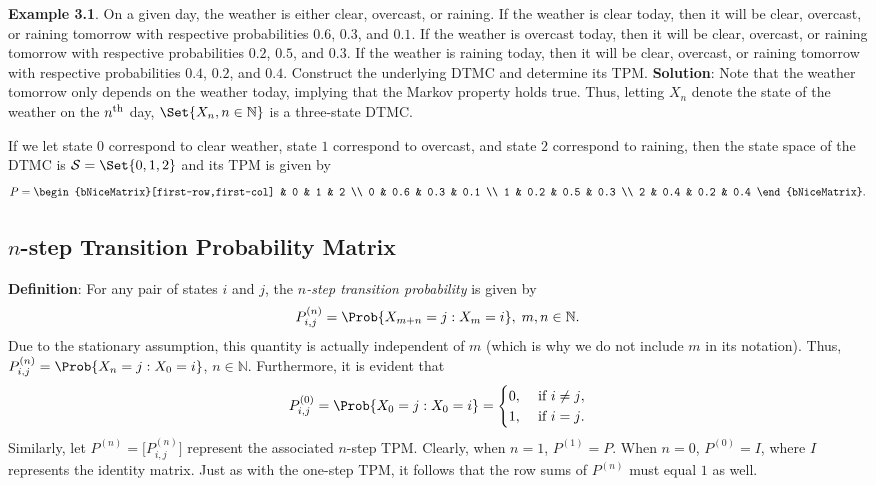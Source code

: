 \begin{Example}
    \textbf{Example 3.1}. On a given day, the weather is either clear, overcast, or raining. If the weather
    is clear today, then it will be clear, overcast, or raining tomorrow with respective probabilities
    $0.6$, $0.3$, and $0.1$. If the weather is overcast today, then it will be clear, overcast, or raining
    tomorrow with respective probabilities $0.2$, $0.5$, and $0.3$. If the weather is raining today, then it
    will be clear, overcast, or raining tomorrow with respective probabilities $0.4$, $0.2$, and $0.4$.
    Construct the underlying DTMC and determine its TPM\@.
    \tcblower{}
    \textbf{Solution}: Note that the weather tomorrow only depends on the weather
    today, implying that the Markov property holds true. Thus,
    letting $ X_n $ denote the state of the weather on the $ n\textsuperscript{th} $
    day, $ \Set{X_n,n\in\mathbb{N}} $ is a three-state DTMC\@.

    If we let state $ 0 $ correspond to clear weather, state $ 1 $
    correspond to overcast, and state $ 2 $ correspond to raining,
    then the state space of the DTMC is $ \mathcal{S}=\Set{0,1,2} $
    and its TPM is given by
    \[ P=\begin{bNiceMatrix}[first-row,first-col]
              & 0   & 1   & 2   \\
            0 & 0.6 & 0.3 & 0.1 \\
            1 & 0.2 & 0.5 & 0.3 \\
            2 & 0.4 & 0.2 & 0.4
        \end{bNiceMatrix}. \]
\end{Example}
\subsection*{$ n $-step Transition Probability Matrix}
\begin{Regular}
    \textbf{Definition}: For any pair of states $ i $ and $ j $, the \emph{$ n $-step transition probability} is given by
    \[ P_{i,j}^{(n)}=\Prob{X_{m+n}=j\given X_m=i},\; m,n\in\mathbb{N}. \]
    Due to the stationary assumption, this quantity is actually independent of $m$ (which is why we
    do not include $m$ in its notation). Thus, $ P_{i,j}^{(n)}=\Prob{X_n=j\given X_0=i} $, $ n\in\mathbb{N} $.
    Furthermore, it is evident that
    \[ P_{i,j}^{(0)}=\Prob{X_0=j\given X_0=i}=
        \begin{cases}
            0, & \text{ if $ i\ne j $}, \\
            1, & \text{ if $ i=j $.}
        \end{cases} \]
    Similarly, let $ P^{(n)}=\bigl[P_{i,j}^{(n)}\bigr] $ represent the associated $ n $-step TPM\@. Clearly, when $ n=1 $,
    $ P^{(1)}=P $. When $ n=0 $, $ P^{(0)}=I $, where $ I $ represents the identity matrix. Just as with the one-step TPM, it follows that
    the row sums of $ P^{(n)} $ must equal $ 1 $ as well.
\end{Regular}
